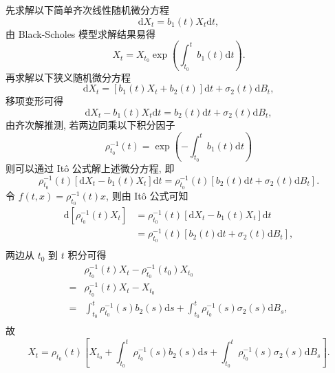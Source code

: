 \documentclass[openany]{ctexbook}
\theoremstyle{kaiti}
\theoremstyle{normal}
\begin{document}
先求解以下简单齐次线性随机微分方程
\begin{equation}
  \mathrm{d}X_t=b_1(t) X_t\mathrm{d}t,
\end{equation}
由 Black-Scholes 模型求解结果易得
\begin{equation}
  X_t=X_{t_0}\exp\left(\int_{t_0}^tb_1(t)\mathrm{d}t\right).
\end{equation}
再求解以下狭义随机微分方程
\begin{equation}
  \mathrm{d}X_t=[b_1(t) X_t+b_2(t)]\mathrm{d}t+\sigma_2(t)\mathrm{d}B_t,
\end{equation}
移项变形可得
\begin{equation}
  \mathrm{d}X_t-b_1(t) X_t\mathrm{d}t=b_2(t)\mathrm{d}t+\sigma_2(t)\mathrm{d}B_t,
\end{equation}
由齐次解推测, 若两边同乘以下积分因子
\begin{equation}
  \rho_{t_0}^{-1}(t)=\exp\left(-\int_{t_0}^tb_1(t)\mathrm{d}t\right)
\end{equation}
则可以通过 It\^o 公式解上述微分方程, 即
\begin{equation}
  \rho_{t_0}^{-1}(t)[\mathrm{d}X_t-b_1(t) X_t]\mathrm{d}t=\rho_{t_0}^{-1}(t)[b_2(t)\mathrm{d}t+\sigma_2(t)\mathrm{d}B_t].
\end{equation}
令 $f(t,x)=\rho_{t_0}^{-1}(t)x$, 则由 It\^o 公式可知
\begin{equation}
  \begin{aligned}
  \mathrm{d}\left[\rho_{t_0}^{-1}(t)X_t\right]
  &=\rho_{t_0}^{-1}(t)[\mathrm{d}X_t-b_1(t) X_t]\mathrm{d}t\\
  &=\rho_{t_0}^{-1}(t)[b_2(t)\mathrm{d}t+\sigma_2(t)\mathrm{d}B_t],\\
  \end{aligned}
\end{equation}
两边从 $t_0$ 到 $t$ 积分可得
\begin{equation}
  \begin{aligned}
    &\rho_{t_0}^{-1}(t)X_t-\rho_{t_0}^{-1}(t_0)X_{t_0}\\
    =&\rho_{t_0}^{-1}(t)X_t-X_{t_0}\\
    =&\int_{t_0}^t\rho_{t_0}^{-1}(s)b_2(s)\mathrm{d}s+\int_{t_0}^t\rho_{t_0}^{-1}(s)\sigma_2(s)\mathrm{d}B_s,\\
  \end{aligned}
\end{equation}
故
\begin{equation}
  X_t=\rho_{t_0}(t)\left[X_{t_0}+\int_{t_0}^t\rho_{t_0}^{-1}(s)b_2(s)\mathrm{d}s+\int_{t_0}^t\rho_{t_0}^{-1}(s)\sigma_2(s)\mathrm{d}B_s\right].
\end{equation}
\end{document}
